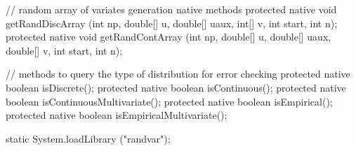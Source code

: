 \begin{code}
\begin{hide}
{   // random array of variates generation native methods
   protected native void getRandDiscArray (int np, double[] u, double[] uaux,
        int[] v, int start, int n);
   protected native void getRandContArray (int np, double[] u, double[] uaux,
        double[] v, int start, int n);
   
   // methods to query the type of distribution for error checking
   protected native boolean isDiscrete();
   protected native boolean isContinuous();
   protected native boolean isContinuousMultivariate();
   protected native boolean isEmpirical();
   protected native boolean isEmpiricalMultivariate();

   static {
      System.loadLibrary ("randvar");
   }
}\end{hide}\end{code}
